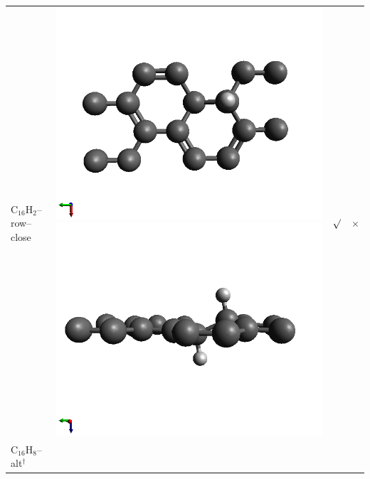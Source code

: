 \documentclass[11pt]{article}
\begin{document}
\begin{table}[h!]
\begin{tabular}[b]{ l c c c }
	{ C$_{16}$H$_{2}$--row--close} & 	
	\includegraphics[width=0.12\tw]{../structures_figures/c16h2_row_close_optimized1.png} 
	\includegraphics[width=0.12\tw]{../structures_figures/c16h2_row_close_optimized2.png} &
	{ $\surd$} & { $\times$} \\
	{ C$_{16}$H$_{8}$--alt$^{\dag}$} & 	

\end{tabular}
\end{table}
\end{document}
